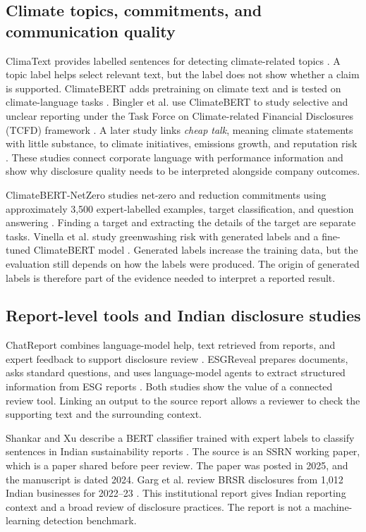 \subsection{Climate topics, commitments, and communication quality}

ClimaText provides labelled sentences for detecting climate-related topics \cite{varini2020}. A topic label helps select relevant text, but the label does not show whether a claim is supported. ClimateBERT adds pretraining on climate text and is tested on climate-language tasks \cite{webersinke2021}. Bingler et al. use ClimateBERT to study selective and unclear reporting under the Task Force on Climate-related Financial Disclosures (TCFD) framework \cite{bingler2022}. A later study links \emph{cheap talk}, meaning climate statements with little substance, to climate initiatives, emissions growth, and reputation risk \cite{bingler2024}. These studies connect corporate language with performance information and show why disclosure quality needs to be interpreted alongside company outcomes.

ClimateBERT-NetZero studies net-zero and reduction commitments using approximately 3,500 expert-labelled examples, target classification, and question answering \cite{schimanski2023}. Finding a target and extracting the details of the target are separate tasks. Vinella et al. study greenwashing risk with generated labels and a fine-tuned ClimateBERT model \cite{vinella2024}. Generated labels increase the training data, but the evaluation still depends on how the labels were produced. The origin of generated labels is therefore part of the evidence needed to interpret a reported result.

\subsection{Report-level tools and Indian disclosure studies}

ChatReport combines language-model help, text retrieved from reports, and expert feedback to support disclosure review \cite{ni2023}. ESGReveal prepares documents, asks standard questions, and uses language-model agents to extract structured information from ESG reports \cite{zou2025}. Both studies show the value of a connected review tool. Linking an output to the source report allows a reviewer to check the supporting text and the surrounding context.

Shankar and Xu describe a BERT classifier trained with expert labels to classify sentences in Indian sustainability reports \cite{shankar2025}. The source is an SSRN working paper, which is a paper shared before peer review. The paper was posted in 2025, and the manuscript is dated 2024. Garg et al. review BRSR disclosures from 1,012 Indian businesses for 2022--23 \cite{garg2025}. This institutional report gives Indian reporting context and a broad review of disclosure practices. The report is not a machine-learning detection benchmark.

